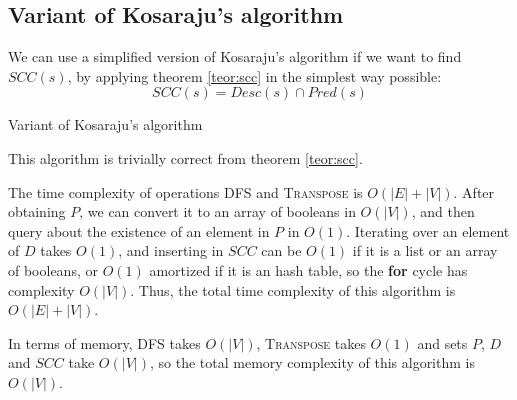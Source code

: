 \subsection{Variant of Kosaraju's algorithm} \label{algorithm-scc-kosaraju-v}
We can use a simplified version of Kosaraju's algorithm if we want to find $SCC(s)$, by applying theorem \ref{teor:scc} in the simplest way possible:
\begin{equation*}
    SCC(s) = Desc(s) \cap Pred(s)
\end{equation*}
\begin{algorithm}[H]
    \caption{Variant of Kosaraju's algorithm}
    \label{alg-kosaraju-v}
    \begin{algorithmic}[1]
             
             
            \State {}
        \EndFunction
    \end{algorithmic}
\end{algorithm}
This algorithm is trivially correct from theorem \ref{teor:scc}.\par
The time complexity of operations \textsc{DFS} and \textsc{Transpose} is $O(|E|+|V|)$. After obtaining $P$, we can convert it to an array of booleans in $O(|V|)$, and then query about the existence of an element in $P$ in $O(1)$. Iterating over an element of $D$ takes $O(1)$, and inserting in $SCC$ can be $O(1)$ if it is a list or an array of booleans, or $O(1)$ amortized if it is an hash table, so the \textbf{for} cycle has complexity $O(|V|)$. Thus, the total time complexity of this algorithm is $O(|E|+|V|)$.\par
In terms of memory, \textsc{DFS} takes $O(|V|)$, \textsc{Transpose} takes $O(1)$ and sets $P$, $D$ and $SCC$ take $O(|V|)$, so the total memory complexity of this algorithm is $O(|V|)$.
